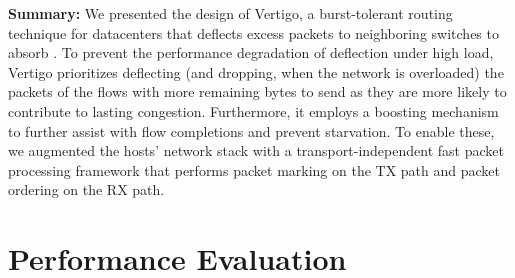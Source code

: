 

\textbf{Summary: }
We presented the design of Vertigo, a burst-tolerant routing technique for datacenters that deflects excess packets to neighboring switches to absorb \bursts. To prevent the performance degradation of deflection under high load, Vertigo prioritizes deflecting (and dropping, when the network is overloaded) the packets of the flows with more remaining bytes to send as they are more likely to contribute to lasting congestion. Furthermore, it employs a boosting mechanism to further assist with flow completions and prevent starvation. To enable these, we augmented the hosts' network stack with a transport-independent fast packet processing framework that performs packet marking on the TX path and packet ordering on the RX path. 

\section{Performance Evaluation}
\label{sec:eval}


